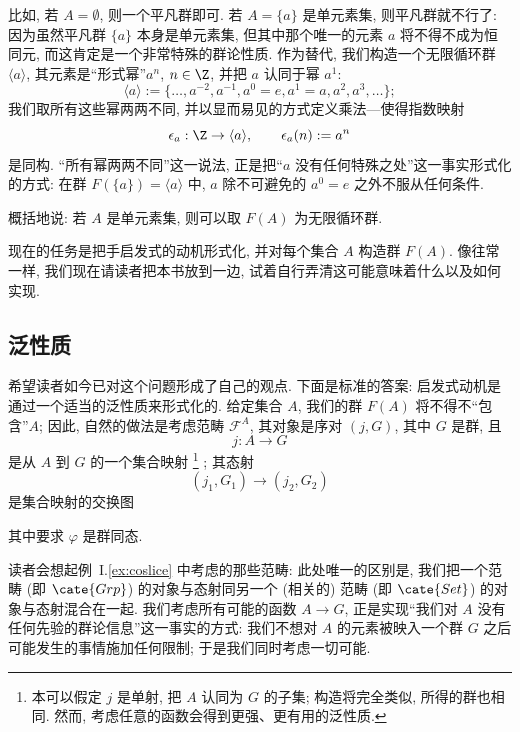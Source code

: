 比如, 若 $A = \emptyset$, 则一个平凡群即可. 若 $A = \{a\}$ 是单元素集, 则平凡群就不行了: 因为虽然平凡群 $\{a\}$ 本身是单元素集, 但其中那个唯一的元素 $a$ 将不得不成为恒同元, 而这肯定是一个非常特殊的群论性质. 作为替代, 我们构造一个无限循环群 $\langle a \rangle$, 其元素是``形式幂''$a^n$, $n \in \Z$, 并把 $a$ 认同于幂 $a^1$:
\[
\langle a \rangle := \{\dots, a^{-2}, a^{-1}, a^0 = e, a^1 = a, a^2, a^3, \dots\};
\]
我们取所有这些幂两两不同, 并以显而易见的方式定义乘法---使得指数映射
\[
\epsilon_a : \Z \to \langle a \rangle, \qquad \epsilon_a(n) := a^n
\]
是同构. ``所有幂两两不同''这一说法, 正是把``$a$ 没有任何特殊之处''这一事实形式化的方式: 在群 $F(\{a\}) = \langle a \rangle$ 中, $a$ 除不可避免的 $a^0 = e$ 之外不服从任何条件.

概括地说: 若 $A$ 是单元素集, 则可以取 $F(A)$ 为无限循环群.

现在的任务是把手启发式的动机形式化, 并对每个集合 $A$ 构造群 $F(A)$. 像往常一样, 我们现在请读者把本书放到一边, 试着自行弄清这可能意味着什么以及如何实现.

\subsection{泛性质}
\label{subsec:free-universal}

希望读者如今已对这个问题形成了自己的观点. 下面是标准的答案: 启发式动机是通过一个适当的泛性质来形式化的. 给定集合 $A$, 我们的群 $F(A)$ 将不得不``包含''$A$; 因此, 自然的做法是考虑范畴 $\mathcal{F}^A$, 其对象是序对 $(j, G)$, 其中 $G$ 是群, 且
\[
j : A \to G
\]
是从 $A$ 到 $G$ 的一个集合映射%
\footnote{本可以假定 $j$ 是单射, 把 $A$ 认同为 $G$ 的子集; 构造将完全类似, 所得的群也相同. 然而, 考虑任意的函数会得到更强、更有用的泛性质.}%
; 其态射
\[
(j_1, G_1) \rightarrow (j_2, G_2)
\]
是集合映射的交换图
\begin{center}
\end{center}
其中要求 $\varphi$ 是群同态.

读者会想起例~I.\ref{ex:coslice} 中考虑的那些范畴: 此处唯一的区别是, 我们把一个范畴 (即 $\cate{Grp}$) 的对象与态射同另一个 (相关的) 范畴 (即 $\cate{Set}$) 的对象与态射混合在一起. 我们考虑所有可能的函数 $A \rightarrow G$, 正是实现``我们对 $A$ 没有任何先验的群论信息''这一事实的方式: 我们不想对 $A$ 的元素被映入一个群 $G$ 之后可能发生的事情施加任何限制; 于是我们同时考虑一切可能.

